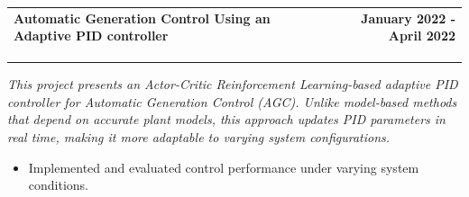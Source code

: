 \documentclass[a4paper,20pt]{article}
\makeatletter
\newcommand{\resumeSubheading}[4]{
  \vspace{-1pt}\item
    \begin{tabular*}{0.97\textwidth}{l@{\extracolsep{\fill}}r}
      \textbf{#1} \small \textit{#4} & #2 \\
      \textit{#3} &  \\
    \end{tabular*}\vspace{-5pt}
}
\newcommand{\resumeSubheading}[5]{ %
  \vspace{-1pt}\item
    \begin{tabular*}{0.97\textwidth}{l@{\extracolsep{\fill}}r}
      \textbf{#1} & #2 \\
      \textit{#3} & \textit{#4} \\
    \end{tabular*} 
    \vspace{-2pt}
    \small #5 %
    \vspace{-5pt}
}
\makeatother
\begin{document}
\resumeSubheading
		{Automatic Generation Control Using an Adaptive PID controller \href{https://github.com/NickNair/Adaptive-PID-controller}{\faExternalLink}}{\textbf{January 2022 - April 2022}}
		{Bachelor Thesis, National Institute of Technology, Surathkal, Karnataka \\ \\}{}
  \textit{This project presents an Actor-Critic Reinforcement Learning-based adaptive PID controller for Automatic Generation Control (AGC). Unlike model-based methods that depend on accurate plant models, this approach updates PID parameters in real time, making it more adaptable to varying system configurations.}
        \begin{itemize}
            \item Implemented and evaluated control performance under varying system conditions.
             \vspace{-5pt}
        \end{itemize}
\vspace{5pt}


\end{document}
